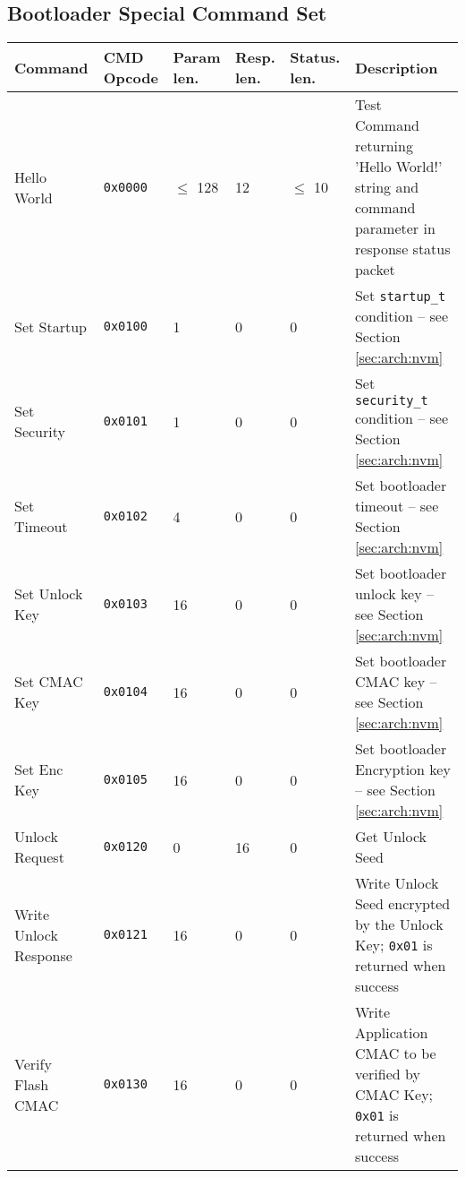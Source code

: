 \clearpage
\subsection{Bootloader Special Command Set}



\begin{table*}[!ht]
  \hspace*{-4cm}
  \begin{tabular}{| p{3cm} | p{1.5cm} | p{1cm} | p{1cm} | p{1cm} | p{4.5cm} | }
      \hline
      \rowcolor{SeaGreen3!30!} {\bf Command} & {\bf CMD Opcode} & {\bf Param len.} & {\bf Resp. len.} & {\bf Status. len.} & {\bf Description} \\
      \hline
      \hline
      Hello World & \texttt{0x0000} & $\leq$ 128 & 12 & $\leq$ 10 & Test Command returning 'Hello World!' string and command parameter in response status packet \\
      \hline
      Set Startup & \texttt{0x0100} & 1 & 0 & 0 & Set \texttt{startup\_t} condition -- see Section \ref{sec:arch:nvm} \\
      \hline
      Set Security & \texttt{0x0101} & 1 & 0 & 0 & Set \texttt{security\_t} condition -- see Section \ref{sec:arch:nvm} \\
      \hline
      Set Timeout & \texttt{0x0102} & 4 & 0 & 0 & Set bootloader timeout -- see Section \ref{sec:arch:nvm} \\
      \hline
      Set Unlock Key & \texttt{0x0103} & 16 & 0 & 0 & Set bootloader unlock key -- see Section \ref{sec:arch:nvm} \\
      \hline
      Set CMAC Key & \texttt{0x0104} & 16 & 0 & 0 & Set bootloader CMAC key -- see Section \ref{sec:arch:nvm} \\
      \hline
      Set Enc Key & \texttt{0x0105} & 16 & 0 & 0 & Set bootloader Encryption key -- see Section \ref{sec:arch:nvm} \\
      \hline
      Unlock Request & \texttt{0x0120} & 0 & 16 & 0 & Get Unlock Seed \\
      \hline
      Write Unlock Response & \texttt{0x0121} & 16 & 0 & 0 & Write Unlock Seed encrypted by the Unlock Key; \texttt{0x01} is returned when success\\
      \hline
      Verify Flash CMAC & \texttt{0x0130} & 16 & 0 & 0 & Write Application CMAC to be verified by CMAC Key; \texttt{0x01} is returned when success\\
      \hline
  \end{tabular}
  \label{tab:specCmd}
 \end{table*}
   
